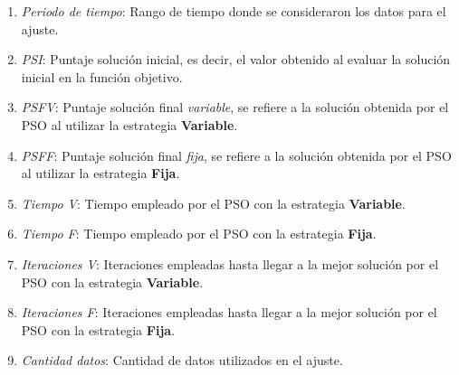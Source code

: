 \begin{enumerate}
    \item \emph{Periodo de tiempo}: Rango de tiempo donde se consideraron los datos para el ajuste.
    \item \emph{PSI}: Puntaje solución inicial, es decir, el valor obtenido al evaluar la solución inicial en la función objetivo.
    \item \emph{PSFV}: Puntaje solución final \emph{variable}, se refiere a la solución obtenida por el PSO al utilizar la estrategia \textbf{Variable}.
    \item \emph{PSFF}: Puntaje solución final \emph{fija}, se refiere a la solución obtenida por el PSO al utilizar la estrategia \textbf{Fija}.
    \item \emph{Tiempo V}: Tiempo empleado por el PSO con la estrategia \textbf{Variable}. 
    \item \emph{Tiempo F}: Tiempo empleado por el PSO con la estrategia \textbf{Fija}. 
    \item \emph{Iteraciones V}: Iteraciones empleadas hasta llegar a la mejor solución por el PSO con la estrategia \textbf{Variable}. 
    \item \emph{Iteraciones F}: Iteraciones empleadas hasta llegar a la mejor solución por el PSO con la estrategia \textbf{Fija}. 
    \item \emph{Cantidad datos}: Cantidad de datos utilizados en el ajuste.
\end{enumerate}

